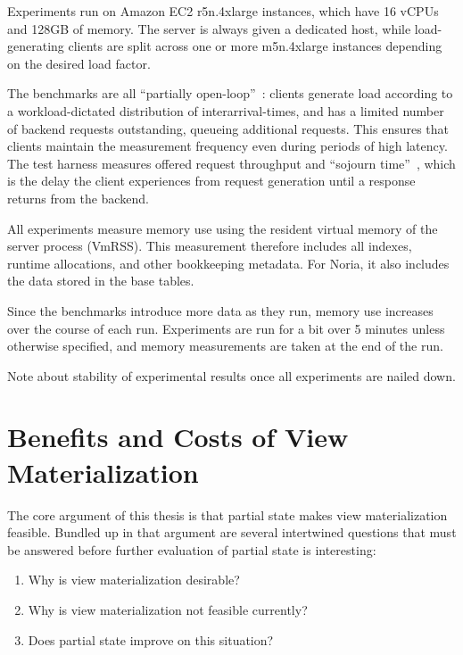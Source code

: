 Experiments run on Amazon EC2 r5n.4xlarge instances, which have 16 vCPUs and
128GB of memory. The server is always given a dedicated host, while
load-generating clients are split across one or more m5n.4xlarge instances
depending on the desired load factor.

The benchmarks are all ``partially open-loop''~\cite{frank-open-loop}:
clients generate load according to a workload-dictated distribution of
interarrival-times, and has a limited number of backend requests outstanding,
queueing additional requests. This ensures that clients maintain the measurement
frequency even during periods of high latency. The test harness measures offered
request throughput and ``sojourn time''~\cite{open-loop-cautionary-tale}, which
is the delay the client experiences from request generation until a response
returns from the backend.

All experiments measure memory use using the resident virtual memory of the
server process (VmRSS). This measurement therefore includes all indexes, runtime
allocations, and other bookkeeping metadata. For Noria, it also includes the
data stored in the base tables.

Since the benchmarks introduce more data as they run, memory use increases over
the course of each run. Experiments are run for a bit over 5 minutes unless
otherwise specified, and memory measurements are taken at the end of the run.

\begin{inprogress}
  Note about stability of experimental results once all experiments are nailed
  down.
\end{inprogress}

\section{Benefits and Costs of View Materialization}
\label{s:eval:why}

The core argument of this thesis is that partial state makes view
materialization feasible. Bundled up in that argument are several intertwined
questions that must be answered before further evaluation of partial state is
interesting:

\begin{enumerate}
    \item Why is view materialization desirable?
    \item Why is view materialization not feasible currently?
    \item Does partial state improve on this situation?
\end{enumerate}

